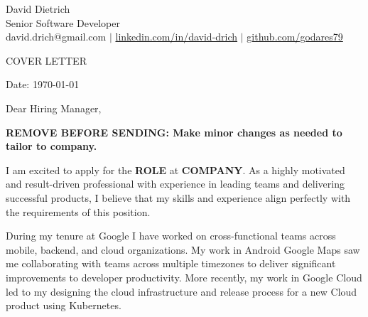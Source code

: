 \documentclass[11pt,a4]{article}
\begin{document}
\begin{center}
    
\centering
{\Huge David Dietrich} \\ %
\vspace{0.1cm}
{\color{UI_blue} \Large{Senior Software Developer}} \\
\vspace{0.1cm}
\large david.drich@gmail.com 
$\vert$
\large {\href{https://www.linkedin.com/in/david-drich/}{linkedin.com/in/david-drich} }
$\vert$
\large {\href{https://github.com/godares79}{github.com/godares79}}

\vspace{-0.15cm} 
{\color{UI_blue} \hrulefill}
\end{center}

\justify
\setlength{\parindent}{0pt}
\setlength{\parskip}{12pt}
\vspace{0.2cm}
\begin{center}
    {\color{UI_blue} \Large{COVER LETTER}}
\end{center}



Date: \today \par \vspace{-0.1cm}
Dear Hiring Manager, %

\textbf{REMOVE BEFORE SENDING: Make minor changes as needed to tailor to company.}

I am excited to apply for the \textbf{ROLE} at \textbf{COMPANY}. As a highly motivated and result-driven professional with experience in leading teams and delivering successful products, I believe that my skills and experience align perfectly with the requirements of this position. \par

During my tenure at Google I have worked on cross-functional teams across mobile, backend, and cloud organizations. My work in Android Google Maps saw me collaborating with teams across multiple timezones to deliver significant improvements to developer productivity. More recently, my work in Google Cloud led to my designing the cloud infrastructure and release process for a new Cloud product using Kubernetes. \par
\end{document}
